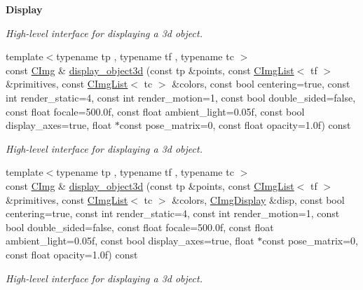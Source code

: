 \begin{Indent}{\bf Display}
\begin{DoxyCompactItemize}
\begin{DoxyCompactList}\small\item\em High-\/level interface for displaying a 3d object. \end{DoxyCompactList}\item 
\hypertarget{structcimg__library_1_1_c_img_aba6c06bb018f060c2809f7584191abe1}{{\footnotesize template$<$typename tp , typename tf , typename tc $>$ }\\const \hyperlink{structcimg__library_1_1_c_img}{C\-Img} \& \hyperlink{structcimg__library_1_1_c_img_aba6c06bb018f060c2809f7584191abe1}{display\-\_\-object3d} (const tp \&points, const \hyperlink{structcimg__library_1_1_c_img_list}{C\-Img\-List}$<$ tf $>$ \&primitives, const \hyperlink{structcimg__library_1_1_c_img_list}{C\-Img\-List}$<$ tc $>$ \&colors, const bool centering=true, const int render\-\_\-static=4, const int render\-\_\-motion=1, const bool double\-\_\-sided=false, const float focale=500.\-0f, const float ambient\-\_\-light=0.\-05f, const bool display\-\_\-axes=true, float $\ast$const pose\-\_\-matrix=0, const float opacity=1.\-0f) const }\label{structcimg__library_1_1_c_img_aba6c06bb018f060c2809f7584191abe1}

\begin{DoxyCompactList}\small\item\em High-\/level interface for displaying a 3d object. \end{DoxyCompactList}\item 
\hypertarget{structcimg__library_1_1_c_img_a89514bba39765770a3f3e559dfb929ee}{{\footnotesize template$<$typename tp , typename tf , typename tc $>$ }\\const \hyperlink{structcimg__library_1_1_c_img}{C\-Img} \& \hyperlink{structcimg__library_1_1_c_img_a89514bba39765770a3f3e559dfb929ee}{display\-\_\-object3d} (const tp \&points, const \hyperlink{structcimg__library_1_1_c_img_list}{C\-Img\-List}$<$ tf $>$ \&primitives, const \hyperlink{structcimg__library_1_1_c_img_list}{C\-Img\-List}$<$ tc $>$ \&colors, \hyperlink{structcimg__library_1_1_c_img_display}{C\-Img\-Display} \&disp, const bool centering=true, const int render\-\_\-static=4, const int render\-\_\-motion=1, const bool double\-\_\-sided=false, const float focale=500.\-0f, const float ambient\-\_\-light=0.\-05f, const bool display\-\_\-axes=true, float $\ast$const pose\-\_\-matrix=0, const float opacity=1.\-0f) const }\label{structcimg__library_1_1_c_img_a89514bba39765770a3f3e559dfb929ee}

\begin{DoxyCompactList}\small\item\em High-\/level interface for displaying a 3d object. \end{DoxyCompactList}\end{DoxyCompactItemize}
\end{Indent}
